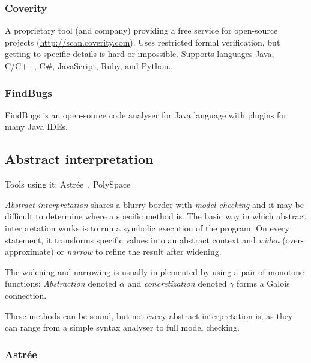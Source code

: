 \subsubsection{Coverity}

A proprietary tool (and company) providing a free service for open-source projects (\url{http://scan.coverity.com}). Uses restricted formal verification, but getting to specific details is hard or impossible. Supports languages Java, C/C++, C\#, JavaScript, Ruby, and Python.

\subsubsection{FindBugs}

FindBugs is an open-source code analyser for Java language with plugins for many Java IDEs.

\subsection{Abstract interpretation}

Tools using it: Astrée~\cite{Astree1,KrenaVojnarOverview}, PolySpace~\cite{KrenaVojnarOverview}

{\em Abstract interpretation} shares a blurry border with {\em model
checking} and it may be difficult to determine where a specific method is.
The basic way in which abstract interpretation works is to run a symbolic
execution of the program. On every statement, it transforms specific values into an abstract context and {\em widen} (over-approximate) or {\em narrow} to refine the result after widening.

The widening and narrowing is usually implemented by using a pair of monotone functions: {\em Abstraction} denoted $\alpha$ and {\em concretization} denoted $\gamma$ forms a Galois connection.

These methods can be sound, but not every abstract interpretation is, as they can range from a simple syntax analyser to full model checking.

\subsubsection{Astrée}

